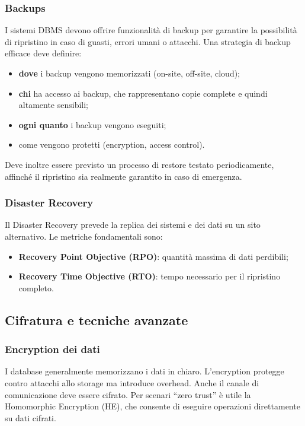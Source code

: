 \subsubsection{Backups}

I sistemi DBMS devono offrire funzionalità di backup per garantire la possibilità di ripristino in caso di guasti, errori umani o attacchi.
Una strategia di backup efficace deve definire:
\begin{itemize}
    \item \textbf{dove} i backup vengono memorizzati (on-site, off-site, cloud);
    \item \textbf{chi} ha accesso ai backup, che rappresentano copie complete e quindi altamente sensibili;
    \item \textbf{ogni quanto} i backup vengono eseguiti;
    \item come vengono protetti (encryption, access control).
\end{itemize}
Deve inoltre essere previsto un processo di restore testato periodicamente, affinché il ripristino sia realmente garantito in caso di emergenza.

\subsubsection{Disaster Recovery}

Il Disaster Recovery prevede la replica dei sistemi e dei dati su un sito alternativo.
Le metriche fondamentali sono:
\begin{itemize}
    \item \textbf{Recovery Point Objective (RPO)}: quantità massima di dati perdibili;
    \item \textbf{Recovery Time Objective (RTO)}: tempo necessario per il ripristino completo.
\end{itemize}

\subsection{Cifratura e tecniche avanzate}

\subsubsection{Encryption dei dati}

I database generalmente memorizzano i dati in chiaro. L'encryption protegge contro attacchi allo storage ma introduce overhead.
Anche il canale di comunicazione deve essere cifrato.
Per scenari “zero trust” è utile la Homomorphic Encryption (HE), che consente di eseguire operazioni direttamente su dati cifrati.

